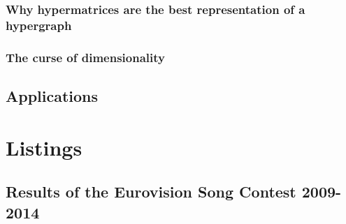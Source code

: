 \documentclass[a4paper,11pt]{report}
\begin{document}
\subsection{Why hypermatrices are the best representation of a hypergraph}\label{promohypermatrices}
\subsection{The curse of dimensionality}

\section{Applications}
\begin{appendices}
  \chapter{Listings} \label{appendixa}%









\begin{landscape}
  \chapter{Results of the Eurovision Song Contest 2009-2014}
  

\end{landscape}
\end{appendices}
\end{document}
